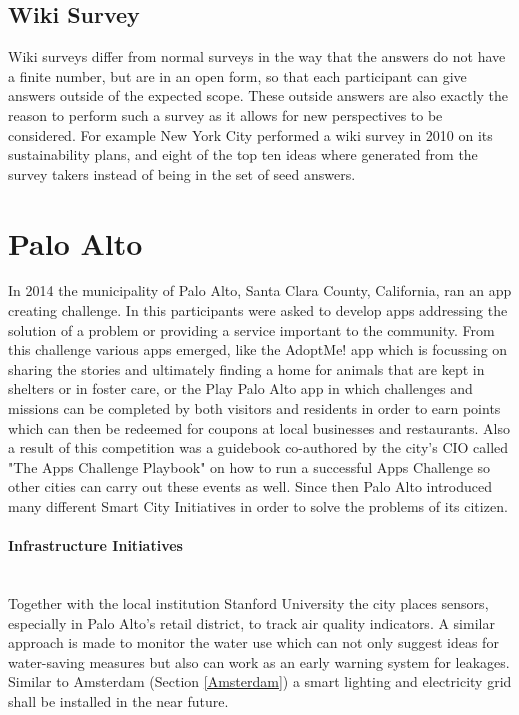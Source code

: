 \documentclass[a4paper,12pt]{report}
\begin{document}
		\subsection[Wiki Survey]{Wiki Survey \cite{BitbyBit}}
		\startsubsection
			Wiki surveys differ from normal surveys in the way that the answers do not have a finite number, but are in an open form, so that each participant can give answers outside of the expected scope. These outside answers are also exactly the reason to perform such a survey as it allows for new perspectives to be considered. For example New York City performed a wiki survey in 2010 on its sustainability plans, and eight of the top ten ideas where generated from the survey takers instead of being in the set of seed answers.
		\closesection
	\closesection
	
	\section[Palo Alto]{Palo Alto \cite{SmartCityPaloAlto}}
	\startsection
		In 2014 the municipality of Palo Alto, Santa Clara County, California, ran an app creating challenge. In this participants were asked to develop apps addressing the solution of a problem or providing a service important to the community. From this challenge various apps emerged, like the AdoptMe! app which is focussing on sharing the stories and ultimately finding a home for animals that are kept in shelters or in foster care, or the Play Palo Alto app in which challenges and missions can be completed by both visitors and residents in order to earn points which can then be redeemed for coupons at local businesses and restaurants. Also a result of this competition was a guidebook co-authored by the city's CIO called "The Apps Challenge Playbook" \cite{AppsChallengePlaybook} on how to run a successful Apps Challenge so other cities can carry out these events as well. Since then Palo Alto introduced many different Smart City Initiatives in order to solve the problems of its citizen.
		\paragraph{Infrastructure Initiatives} \hfill \\
		Together with the local institution Stanford University the city places sensors, especially in Palo Alto's retail district, to track air quality indicators. A similar approach is made to monitor the water use which can not only suggest ideas for water-saving measures but also can work as an early warning system for leakages. Similar to Amsterdam (Section \ref{Amsterdam}) a smart lighting and electricity grid shall be installed in the near future.
\end{document}
